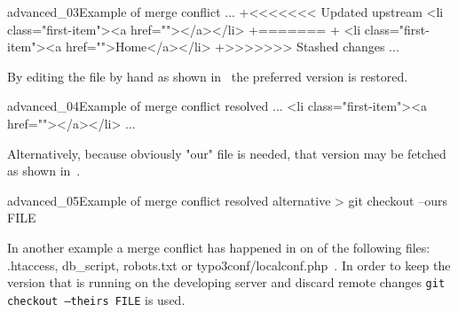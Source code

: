 \begin{codelisting}{advanced_03}{Example of merge conflict}
...
+<<<<<<< Updated upstream                                                                                                                                                                                                                    
    <li class="first-item"><a href=""></a></li>
+=======                                                                                                                                                                                                                                     
+   <li class="first-item"><a href="">Home</a></li>                                                                                                                                                              
+>>>>>>> Stashed changes
...
\end{codelisting}
By editing the file by hand as shown in~ the preferred version is restored.
\begin{codelisting}{advanced_04}{Example of merge conflict resolved}
...
    <li class="first-item"><a href=""></a></li>
...
\end{codelisting}
Alternatively, because obviously "our" file is needed, that version may be fetched as shown in~.
\begin{codelisting}{advanced_05}{Example of merge conflict resolved alternative}
> git checkout --ours FILE
\end{codelisting}
In another example a merge conflict has happened in on of the following files: .htaccess, db\_script, robots.txt or typo3conf/localconf.php~. In order to keep the version that is running on the developing server and discard remote changes \texttt{git checkout --theirs FILE} is used.
